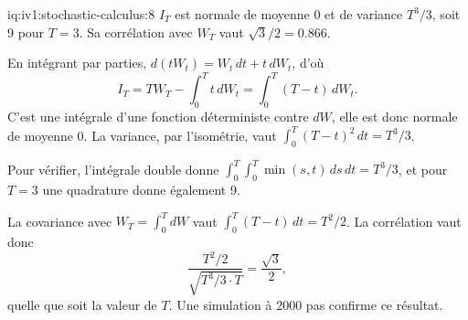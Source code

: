 \enlargethispage{-1\baselineskip}%
\begin{solution}{iq:iv1:stochastic-calculus:8}
$I_T$ est normale de moyenne 0 et de variance $T^3/3$, soit 9 pour $T = 3$. Sa corrélation avec $W_T$ vaut $\sqrt{3}/2 = 0.866$.

En intégrant par parties, $d(tW_t) = W_t\,dt + t\,dW_t$, d'où
\[
I_T = TW_T - \int_0^Tt\,dW_t = \int_0^T(T - t)\,dW_t.
\]
C'est une intégrale d'une fonction déterministe contre $dW$, elle est donc normale de moyenne 0. La variance, par l'isométrie, vaut $\int_0^T(T - t)^2\,dt = T^3/3$.

Pour vérifier, l'intégrale double donne $\int_0^T\int_0^T\min(s, t)\,ds\,dt = T^3/3$, et pour $T = 3$ une quadrature donne également 9.

La covariance avec $W_T = \int_0^T dW$ vaut $\int_0^T(T - t)\,dt = T^2/2$. La corrélation vaut donc
\[
\frac{T^2/2}{\sqrt{T^3/3 \cdot T}} = \frac{\sqrt{3}}{2},
\]
quelle que soit la valeur de $T$. Une simulation à 2000 pas confirme ce résultat.



\end{solution}

